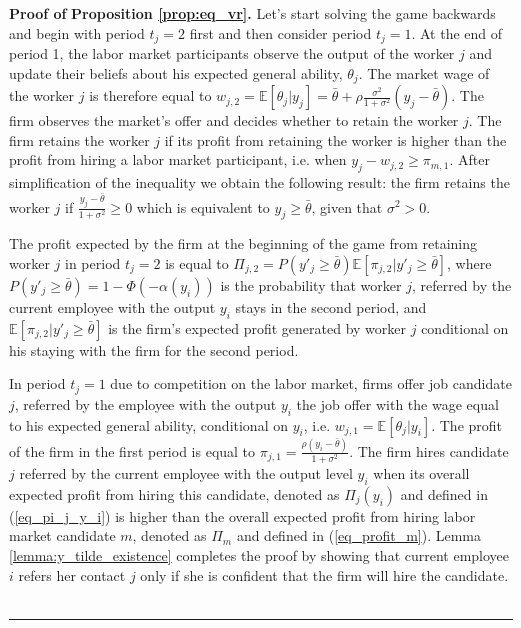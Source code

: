 \documentclass[12pt]{article}
\newenvironment{proof}[1][Proof of]{\noindent\textbf{#1} }{\ \rule{0.5em}{0.5em}}
\begin{document}
\begin{proof}
    \textbf{Proposition \ref{prop:eq_vr}.}
    Let's start solving the game backwards and begin with period $t_j = 2$ first and then consider period $t_j = 1$. At the end of period 1, the labor market participants observe the output of the worker $j$ and update their beliefs about his expected general ability, $\theta_j$. The market wage of the worker $j$ is therefore equal to $w_{j,2} = \mathbb{E}[\theta_j | y_j] = \bar{\theta} + \rho\frac{\sigma^2}{1+\sigma^2}(y_j - \bar{\theta})$. The firm observes the market's offer and decides whether to retain the worker $j$. The firm retains the worker $j$ if its profit from retaining the worker is higher than the profit from hiring a labor market participant, i.e. when $y_j - w_{j,2} \geq \pi_{m,1}$. After simplification of the inequality we obtain the following result: the firm retains the worker $j$ if $\frac{y_j - \bar{\theta}}{1+\sigma^2} \geq 0$ which is equivalent to $y_j \geq \bar{\theta}$, given that $\sigma^2 >0$. 
    
    The profit expected by the firm at the beginning of the game from retaining worker $j$ in period $t_j = 2$ is equal to $\Pi_{j,2} = P(y'_j \geq \bar{\theta})\mathbb{E}[\pi_{j,2}|y'_j \geq \bar{\theta}]$, where $P(y'_j \geq \bar{\theta}) = 1-\Phi(-\alpha(y_i))$ is the probability that worker $j$, referred by the current employee with the output $y_i$ stays in the second period, and $\mathbb{E}[\pi_{j,2}|y'_j \geq \bar{\theta}]$ is the firm's expected profit generated by worker $j$ conditional on his staying with the firm for the second period.  
    
    In period $t_j = 1$ due to competition on the labor market, firms offer job candidate $j$, referred by the employee with the output $y_i$ the job offer with the wage equal to his expected general ability, conditional on $y_i$, i.e. $w_{j,1} = \mathbb{E}[\theta_j| y_i]$. The profit of the firm in the first period is equal to $\pi_{j,1} = \frac{\rho(y_i - \bar{\theta})}{1+\sigma^2}$. The firm hires candidate $j$ referred by the current employee with the output level $y_i$ when its overall expected profit from hiring this candidate, denoted as $\Pi_j(y_i)$ and defined in (\ref{eq_pi_j_y_i}) is higher than the overall expected profit from hiring labor market candidate $m$, denoted as $\Pi_m$ and defined in (\ref{eq_profit_m}). Lemma \ref{lemma:y_tilde_existence} completes the proof by showing that current employee $i$ refers her contact $j$ only if she is confident that the firm will hire the candidate.
\end{proof}
\end{document}
